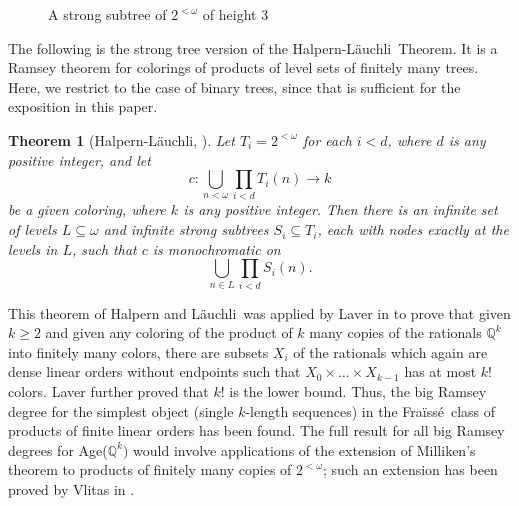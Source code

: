 \documentclass{amsart}
\newtheorem{thm}{Theorem}[section]
\theoremstyle{remark}
\theoremstyle{definition}
\theoremstyle{remark}
\newcommand{\om}{\omega}
\newcommand{\sse}{\subseteq}
\newcommand{\ra}{\rightarrow}
\newcommand{\Fraisse}{Fra{\"{i}}ss{\'{e}}}
\newcommand{\Lauchli}{L{\"{a}}uchli}
\begin{document}
\begin{figure}
\caption{A strong subtree of $2^{<\om}$ of height $3$}
\end{figure}


The following is  the strong tree version of the Halpern-\Lauchli\ Theorem.
It is a Ramsey theorem for colorings of products of level sets  of finitely many trees.
Here, we  restrict to the case of binary trees, since that is sufficient for the exposition in this paper.


\begin{thm}[Halpern-\Lauchli, \cite{Halpern/Lauchli66}]\label{thm.HL}
Let  $T_i=2^{<\om}$ for each $i<d$, where $d$ is any positive integer, and
let
\begin{equation}
c:\bigcup_{n<\om}\prod_{i<d} T_i(n)\ra k
\end{equation}
 be a given coloring, where $k$ is any positive integer.
Then there is an infinite set of levels $L\sse \om$ and infinite  strong subtrees $S_i\sse T_i$,  each with  nodes exactly at the levels in $L$,
such that $c$ is monochromatic on
\begin{equation}
\bigcup_{n\in L}\prod_{i<d} S_i(n).
\end{equation}
\end{thm}



This theorem of Halpern and \Lauchli\ was applied by Laver in
 \cite{Laver84}
to prove that
given $k\ge 2$ and given
any coloring of the product of $k$ many copies of the rationals  $\mathbb{Q}^k$
into finitely many colors,
there are subsets $X_i$ of the rationals which again are  dense linear orders without endpoints such that
$X_0\times\dots\times X_{k-1}$ has at most $k!$ colors.
Laver further proved that  $k!$ is  the lower bound.
Thus, the big Ramsey degree for the simplest object (single $k$-length sequences) in the \Fraisse\ class of products of finite linear orders
has been found.
The full  result for all big Ramsey degrees for  Age($\mathbb{Q}^k)$ would involve applications of  the extension of  Milliken's  theorem to  products of finitely many copies of $2^{<\om}$;
such an extension
 has been proved by Vlitas in \cite{Vlitas14}.
\end{document}
